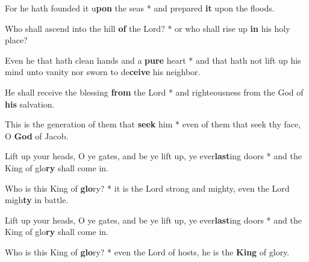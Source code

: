 \begin{multicols}{2}
	For he hath founded it u\textbf{pon} the seas * and prepared \textbf{it} upon the floods.
	
	Who shall ascend into the hill \textbf{of} the Lord? * or who shall rise up \textbf{in} his holy place?
	
	Even he that hath clean hands and a \textbf{pure} heart * and that hath not lift up his mind unto vanity nor sworn to de\textbf{ceive} his neighbor.
	
	He shall receive the blessing \textbf{from} the Lord * and righteousness from the God of \textbf{his} salvation.
	
	This is the generation of them that \textbf{seek} him * even of them that seek thy face, O \textbf{God} of Jacob.
	
	Lift up your heads, O ye gates, and be ye lift up, ye ever\textbf{last}ing doors * and the King of glo\textbf{ry} shall come in.
	
	Who is this King of \textbf{glo}ry? * it is the Lord strong and mighty, even the Lord migh\textbf{ty} in battle.
	
	Lift up your heads, O ye gates, and be ye lift up, ye ever\textbf{last}ing doors * and the King of glo\textbf{ry} shall come in.
	
	Who is this King of \textbf{glo}ry? * even the Lord of hosts, he is the \textbf{King} of glory.
\end{multicols}